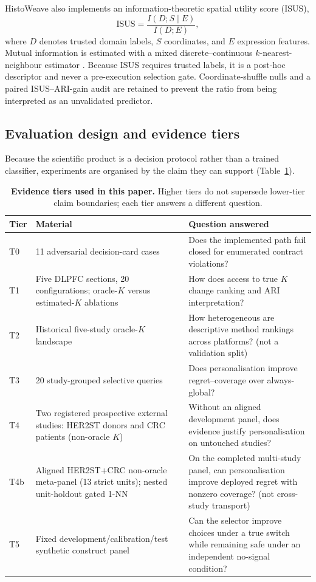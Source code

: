 \documentclass[12pt]{article}
\newcommand{\software}{HistoWeave}
\begin{document}
\software{} also implements an information-theoretic spatial utility score
(ISUS),
\[
  \mathrm{ISUS} = \frac{I(D;S\mid E)}{I(D;E)},
\]
where \(D\) denotes trusted domain labels, \(S\) coordinates, and \(E\)
expression features. Mutual information is estimated with a mixed
discrete--continuous \(k\)-nearest-neighbour estimator \citep{ross2014}.
Because ISUS requires trusted labels, it is a post-hoc descriptor and never a
pre-execution selection gate. Coordinate-shuffle nulls and a paired
ISUS--ARI-gain audit are retained to prevent the ratio from being interpreted
as an unvalidated predictor.

\subsection{Evaluation design and evidence tiers}

Because the scientific product is a decision protocol rather than a trained
classifier, experiments are organised by the claim they can support
(Table~\ref{tab:tiers}).

\begin{table}[t]
\centering
\caption{\textbf{Evidence tiers used in this paper.} Higher tiers do not
supersede lower-tier claim boundaries; each tier answers a different
question.}
\label{tab:tiers}
\begin{tabular}{@{}llp{}@{}}
\toprule
\textbf{Tier} & \textbf{Material} & \textbf{Question answered} \\
\midrule
T0 & 11 adversarial decision-card cases &
Does the implemented path fail closed for enumerated contract violations? \\
T1 & Five DLPFC sections, 20 configurations;
oracle-\(K\) versus estimated-\(K\) ablations &
How does access to true \(K\) change ranking and ARI interpretation? \\
T2 & Historical five-study oracle-\(K\) landscape &
How heterogeneous are descriptive method rankings across platforms?
(not a validation split) \\
T3 & 20 study-grouped selective queries &
Does personalisation improve regret--coverage over always-global? \\
T4 & Two registered prospective external studies: HER2ST donors and CRC
patients (non-oracle \(K\)) &
Without an aligned development panel, does evidence justify personalisation
on untouched studies? \\
T4b & Aligned HER2ST+CRC non-oracle meta-panel (13 strict units); nested
unit-holdout gated 1-NN &
On the completed multi-study panel, can personalisation improve deployed
regret with nonzero coverage? (not cross-study transport) \\
T5 & Fixed development/calibration/test synthetic construct panel &
Can the selector improve choices under a true switch while remaining safe
under an independent no-signal condition? \\
\bottomrule
\end{tabular}
\end{table}
\end{document}
